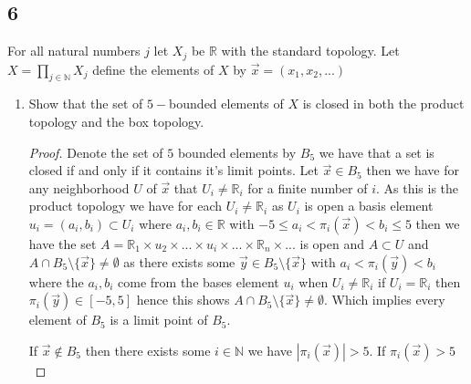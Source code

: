\documentclass{amsart}
\theoremstyle{plain}
\theoremstyle{definition}
\theoremstyle{remark}
\begin{document}
\subsection*{6} 
For all natural numbers $j$ let $X_j$ be $\mathbb{R}$ with the standard topology. Let $X=\prod_{j\in \mathbb{N}}X_j$ define the elements of $X$ by $\vec x=(x_1,x_2,...)$

\begin{enumerate}
    \item Show that the set of $5-$bounded elements of $X$ is closed in both the product topology and the box topology.
    \begin{proof}
        Denote the set of $5$ bounded elements by $B_5$ we have that a set is closed if and only if it contains it's limit points. Let $\vec{x}\in B_5$ then we have for any neighborhood $U$ of $\vec{x}$ that $U_i\not=  \mathbb R_i$ for a finite number of $i$. As this is the product topology we have for each $U_i\not = \mathbb{R}_i$  as $U_i$ is open a basis element $u_i=(a_i,b_i)\subset U_i $ where $a_i,b_i\in \mathbb{R}$ with $-5\leq a_i<\pi_i(\vec{x})<b_i\leq 5$ then we have the set $A=\mathbb{R}_1 \times u_2\times ...\times u_i\times ...\times \mathbb R_n \times ...$ is open and $A\subset U$ and $A\cap B_5\setminus \{\vec{x}\}\not = \emptyset$ as there exists some $\vec{y}\in B_5\setminus \{\vec{x}\}$ with $a_i<\pi_i(\vec{y})<b_i$ where the $a_i,b_i$ come from the bases element $u_i$ when $U_i\not = \mathbb{R}_i$ if $U_i=\mathbb{R}_i$ then $\pi_i(\vec{y})\in [-5,5]$ hence this shows $A\cap B_5\setminus \{\vec{x}\}\not = \emptyset$. Which implies every element of $B_5$ is a limit point of $B_5$. 

        If $\vec{x}\not \in B_5$ then there exists some $i\in \mathbb{N}$ we have $|\pi_i(\vec{x})|> 5$. If $\pi_i(\vec{x})>5$

    \end{proof}
\end{enumerate}
\end{document}
